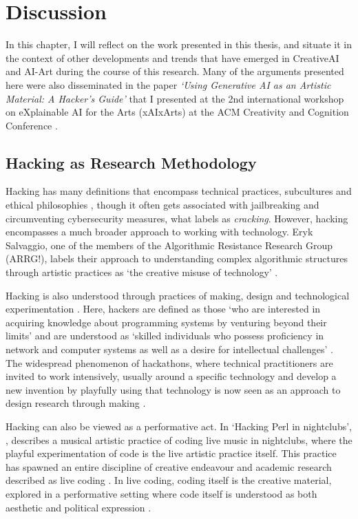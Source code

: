 \chapter{Discussion}
\label{ch:discussion}

In this chapter, I will reflect on the work presented in this thesis, and situate it in the context of other developments and trends that have emerged in CreativeAI and AI-Art during the course of this research.
Many of the arguments presented here were also disseminated in the paper \textit{`Using Generative AI as an Artistic Material: A Hacker's Guide’} that I presented at the 2nd international workshop on eXplainable AI for the Arts (xAIxArts) at the ACM Creativity and Cognition Conference \citep{broad2024using}.


\section{Hacking as Research Methodology}

Hacking has many definitions that encompass technical practices, subcultures and ethical philosophies \citep{jordan2017genealogy}, though it often gets associated with jailbreaking and circumventing cybersecurity measures, what \cite{stallman2002hacking} labels as \textit{cracking}.
However, hacking encompasses a much broader approach to working with technology.
Eryk Salvaggio, one of the members of the Algorithmic Resistance Research Group (ARRG!), labels their approach to understanding complex algorithmic structures through artistic practices as `the creative misuse of technology' \citep{salvaggio2023cultural}.

Hacking is also understood through practices of making, design and technological experimentation \citep{hunsinger2016democratization}.
Here, hackers are defined as those `who are interested in acquiring knowledge about programming systems by venturing beyond their limits' and are understood as `skilled individuals who possess proficiency in network and computer systems as well as a desire for intellectual challenges' \citep{richterich2017introduction}.
The widespread phenomenon of hackathons, where technical practitioners are invited to work intensively, usually around a specific technology and develop a new invention by playfully using that technology is now seen as an approach to design research through making \citep{flus2021design, falk2022future, rys2023invention}.

Hacking can also be viewed as a performative act. In `Hacking Perl in nightclubs', \cite{mclean2004hacking}, describes a musical artistic practice of coding live music in nightclubs, where the playful experimentation of code is the live artistic practice itself. 
This practice has spawned an entire discipline of creative endeavour and academic research described as live coding \citep{selvaraj2021live}.
In live coding, coding itself is the creative material, explored in a performative setting where code itself is understood as both aesthetic and political expression \citep{cox2012speaking}.

